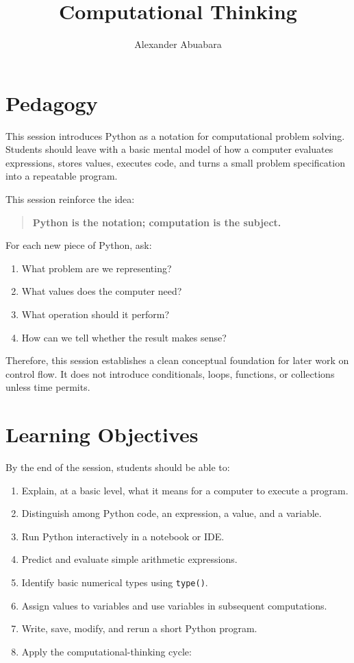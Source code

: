\documentclass[11pt]{article}
\title{\textbf{Computational Thinking
}}
\author{Alexander Abuabara}
\date{}
\begin{document}
\maketitle

\section*{Pedagogy}

This session introduces Python as a notation for computational problem solving. Students should leave with a basic mental model of how a computer evaluates expressions, stores values, executes code, and turns a small problem specification into a repeatable program.

This session reinforce the idea:

\begin{quote}
\textbf{Python is the notation; computation is the subject.}
\end{quote}

For each new piece of Python, ask:

\begin{enumerate}
    \item What problem are we representing?
    \item What values does the computer need?
    \item What operation should it perform?
    \item How can we tell whether the result makes sense?
\end{enumerate}

Therefore, this session establishes a clean conceptual foundation for later work on control flow.
It does not introduce conditionals, loops, functions, or collections unless time permits.

\section*{Learning Objectives}

By the end of the session, students should be able to:

\begin{enumerate}[label=\arabic*.]
    \item Explain, at a basic level, what it means for a computer to execute a program.
    \item Distinguish among Python code, an expression, a value, and a variable.
    \item Run Python interactively in a notebook or IDE.
    \item Predict and evaluate simple arithmetic expressions.
    \item Identify basic numerical types using \texttt{type()}.
    \item Assign values to variables and use variables in subsequent computations.
    \item Write, save, modify, and rerun a short Python program.
    \item Apply the computational-thinking cycle:
\end{enumerate}
\end{document}
